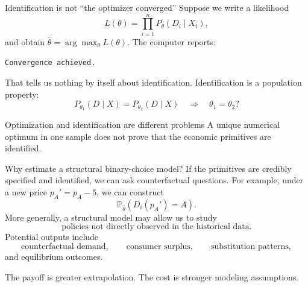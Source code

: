 \documentclass[aspectratio=169,11pt]{beamer}
\newcommand{\Pp}{\mathbb{P}}
\begin{document}
\begin{frame}{Identification is not ``the optimizer converged''}
Suppose we write a likelihood
\[
L(\theta) = \prod_{i=1}^{n} P_\theta(D_i\mid X_i),
\]
and obtain $\hat\theta=\arg\max_{\theta}L(\theta)$. The computer reports:
\begin{center}
\texttt{Convergence achieved.}
\end{center}
\pause
That tells us nothing by itself about identification.
Identification is a population property:
\[
P_{\theta_1}(D\mid X) = P_{\theta_2}(D\mid X)
\quad\Longrightarrow\quad
\theta_1=\theta_2?
\]

\begin{alertblock}{Optimization and identification are different problems}
A unique numerical optimum in one sample does not prove that the
economic primitives are identified.
\end{alertblock}
\end{frame}

\begin{frame}{Why estimate a structural binary-choice model?}
If the primitives are credibly specified and identified, we can ask
counterfactual questions. For example, under a new price $p_A'=p_A-5$,
we can construct
\[
\Pp_{\hat\theta}\left(D_i(p_A')=A\right).
\]
More generally, a structural model may allow us to study
\[
\boxed{\text{policies not directly observed in the historical data}.}
\]
Potential outputs include
\[
\text{counterfactual demand},
\qquad
\text{consumer surplus},
\qquad
\text{substitution patterns},
\]
and equilibrium outcomes.

\vspace{0.25em}

The payoff is greater extrapolation.
The cost is stronger modeling assumptions.
\end{frame}
\end{document}

